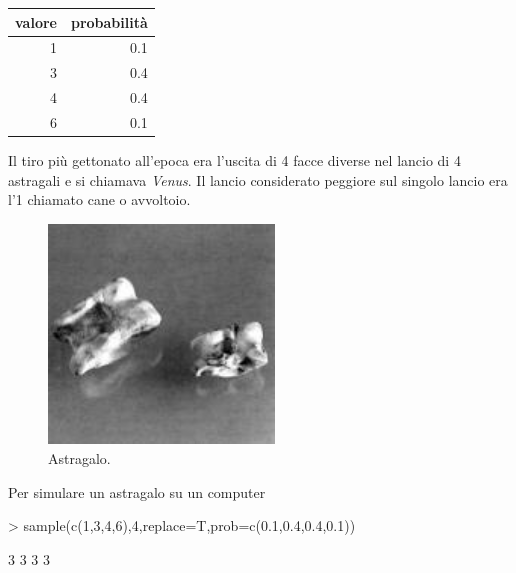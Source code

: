 \documentclass[onecolumn,12pt]{book}
\begin{document}
\begin{center}\begin{tabular}{|r|r |}
\hline
 valore&  probabilit\`a \\
\hline
1&0.1\\
3 &0.4\\
4& 0.4\\
6&0.1\\
 \hline
\end{tabular}
\end{center}
Il tiro pi\`u gettonato all'epoca era l'uscita di 4 facce diverse nel lancio di 4 astragali e si chiamava {\it Venus}.
Il lancio considerato peggiore sul singolo lancio era l'1 chiamato cane o avvoltoio.
\begin{figure}[htbp]
\begin{center}
\includegraphics[width=6cm]{../grafici/astragals.jpeg}
\caption{ Astragalo. }
\label{fig:astragalo}
\end{center}
\end{figure}
Per simulare un astragalo su un computer
\begin{Schunk}
\begin{Sinput}
> sample(c(1,3,4,6),4,replace=T,prob=c(0.1,0.4,0.4,0.1))
\end{Sinput}
\begin{Soutput}
[1] 3 3 3 3
\end{Soutput}
\end{Schunk}
\end{document}
